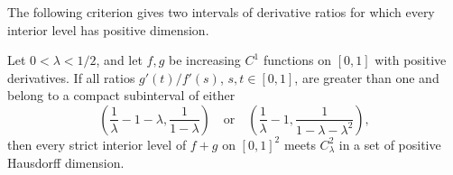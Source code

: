 The following criterion gives two intervals of derivative ratios for
which every interior level has positive dimension.

\begin{lemma}\label{lem:two-bands}
Let \(0<\lambda<1/2\), and let \(f,g\) be increasing \(C^1\)
functions on \([0,1]\) with positive derivatives.
If all ratios \(g'(t)/f'(s)\), \(s,t\in[0,1]\), are greater than
one and belong to a compact subinterval of either
\begin{equation}\label{eq:two-bands}
\left(\frac1\lambda-1-\lambda,\frac1{1-\lambda}\right)
\quad\text{or}\quad
\left(\frac1\lambda-1,\frac1{1-\lambda-\lambda^2}\right),
\end{equation}
then every strict interior level of \(f+g\) on \([0,1]^2\)
meets \(C_\lambda^2\) in a set of positive Hausdorff dimension.
\end{lemma}
